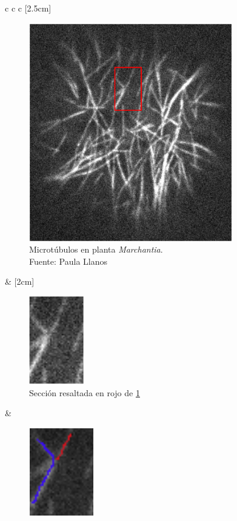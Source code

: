 \begin{figure}[h]
    \begin{tabular}{c c c}
        [2.5cm]{
        \begin{subfigure}[t]{0.4\textwidth}
        \includegraphics[scale=0.5]{imagenes/NoConsenso.png}
        \caption{Microt\'ubulos en planta {\it Marchantia}.\\Fuente: Paula Llanos}
        \label{fig:NoConsensoGeneral}
        \end{subfigure}  
        }
        &
        [2cm]{
        \begin{subfigure}[t]{0.25\textwidth}
        \includegraphics[]{imagenes/NoConsenso2.png}
        \caption{Secci\'on resaltada en rojo de \ref{fig:NoConsensoGeneral}}
        \label{fig:NoConsensoRect}
        \end{subfigure}
        }
        &
        \begin{subfigure}[t]{0.21\textwidth}
        \includegraphics[scale=0.8]{imagenes/NoConsenso3.png}

\end{subfigure}
\end{tabular}
\end{figure}
